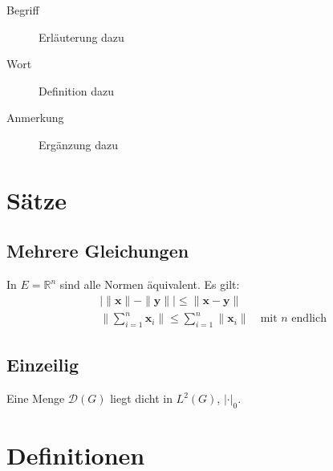 \begin{description}
	\item[Begriff] Erläuterung dazu
	\item[Wort] Definition dazu
	\item[Anmerkung] Ergänzung dazu
\end{description}


\section{Sätze}


\subsection{Mehrere Gleichungen}

\begin{theorem}
	In $E=\mathbb{R}^n$ sind alle Normen äquivalent. Es gilt:
	\begin{align}
		& \big| \|\mathbf{x}\| - \|\mathbf{y}\| \big| \leq \|\mathbf{x}-\mathbf{y}\| \\
		& \Big\|\sum_{i=1}^n \mathbf{x}_i\Big\| \leq \sum_{i=1}^n \|\mathbf{x}_i\|
		  \quad\text{mit $n$ endlich}
	\end{align}
\end{theorem}

\subsection{Einzeilig}

\begin{theorem}
	Eine Menge $\mathcal{D}(G)$ liegt dicht in $L^2(G)$, $|\cdot|_0$.
\end{theorem}


\section{Definitionen}

